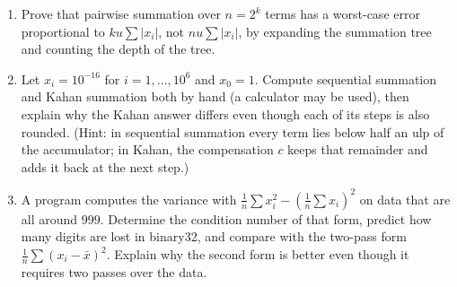 \begin{latihan}
\begin{enumerate}
  \item Prove that pairwise summation over $n=2^{k}$ terms has a worst-case error
        proportional to $ku\sum|x_{i}|$, not $nu\sum|x_{i}|$, by expanding
        the summation tree and counting the depth of the tree.

  \item Let $x_{i}=10^{-16}$ for $i=1,\dots,10^{6}$ and $x_{0}=1$. Compute
        sequential summation and Kahan summation both by hand (a calculator may be
        used), then explain why the Kahan answer differs even though
        each of its steps is also rounded.
        (Hint: in sequential summation every term lies below half an ulp
        of the accumulator; in Kahan, the compensation $c$ keeps that remainder and adds it
        back at the next step.)

  \item A program computes the variance with
        $\frac1n\sum x_{i}^{2}-\left(\frac1n\sum x_{i}\right)^{2}$ on data that
        are all around $999$. Determine the condition number of that form, predict
        how many digits are lost in binary32, and compare with the
        two-pass form $\frac1n\sum(x_{i}-\bar{x})^{2}$. Explain why the second form is
        better even though it requires two passes over the data.
\end{enumerate}
\end{latihan}

